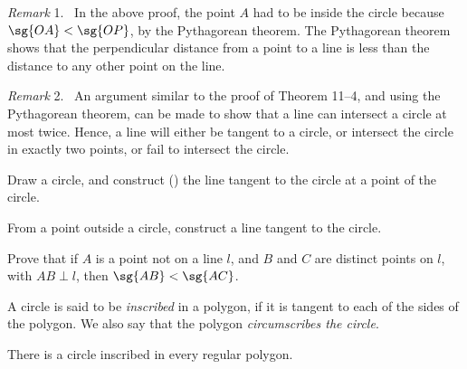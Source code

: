 \documentclass[11pt]{book}
\theoremstyle{bkplain}
\theoremstyle{XIplainnote}
\theoremstyle{bkplain}
\newenvironment{XIremarkn}[1]{\par\medskip\noindent\emph{Remark} #1.\ }%
  {\par\medskip}
\theoremstyle{bkplain}
\begin{document}
\begin{XIremarkn}{1}
In the above proof, the point $A$ had to be inside the circle because
$\sg{OA} < \sg{OP}$, by the Pythagorean theorem. The Pythagorean theorem shows
that the perpendicular distance from a point to a line is less than the
distance to any other point on the line.
\end{XIremarkn}

\begin{XIremarkn}{2}
An argument similar to the proof of Theorem 11--4, and using the Pythagorean
theorem, can be made to show that a line can intersect a circle at most twice.
Hence, a line will either be tangent to a circle, or intersect the circle in
exactly two points, or fail to intersect the circle.
\end{XIremarkn}

\begin{exercisecols}
\begin{exlist}
\item Draw a circle, and construct (\RC) the line tangent to the circle at a
      point of the circle.
\item[\stex 2.] From a point outside a circle, construct a line tangent to the
      circle.
\item[3.] Prove that if $A$ is a point not on a line $l$, and $B$ and $C$ are
      distinct points on $l$, with $AB \perp l$, then $\sg{AB} < \sg{AC}$.
\end{exlist}
\end{exercisecols}

\begin{definition}
A circle is said to be \emph{inscribed} in a polygon, if it is tangent to each
of the sides of the polygon. We also say that the polygon \emph{circumscribes
the circle}.
\end{definition}

\begin{theorem}
There is a circle inscribed in every regular polygon.
\end{theorem}

\begin{steps}
\end{steps}
\end{document}
